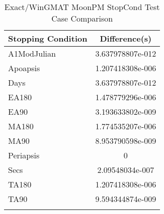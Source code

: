 \begin{table}[htbp!]
\centering
\caption{ Exact/WinGMAT MoonPM StopCond Test Case Comparison}
      \begin{tabular}{lc}
      \hline\hline
          Stopping Condition & Difference(s) \\
         \hline
         A1ModJulian & 3.637978807e-012 \\
         Apoapsis & 1.207418308e-006 \\
         Days & 3.637978807e-012 \\
         EA180 & 1.478779296e-006 \\
         EA90 & 3.193633802e-009 \\
         MA180 & 1.774535207e-006 \\
         MA90 & 8.953790598e-009 \\
         Periapsis & 0 \\
         Secs & 2.09548034e-007 \\
         TA180 & 1.207418308e-006 \\
         TA90 & 9.594344874e-009 \\
      \hline\hline
      \label{Table: Exact-WinGMAT MoonPM StopCond Table} 
\end{tabular}
\end{table}
